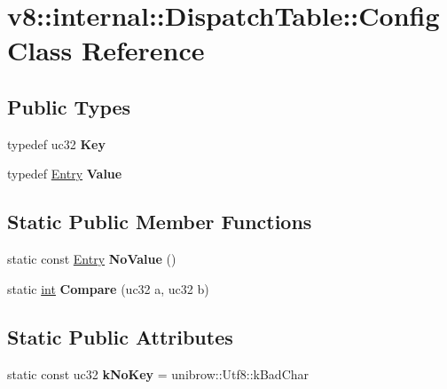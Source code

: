 \hypertarget{classv8_1_1internal_1_1DispatchTable_1_1Config}{}\section{v8\+:\+:internal\+:\+:Dispatch\+Table\+:\+:Config Class Reference}
\label{classv8_1_1internal_1_1DispatchTable_1_1Config}
\subsection*{Public Types}
\begin{DoxyCompactItemize}
\item 
\mbox{\label{classv8_1_1internal_1_1DispatchTable_1_1Config_a3e54d76bbce85cbd2193db08c09689cb}} 
typedef uc32 {\bfseries Key}
\item 
\mbox{\label{classv8_1_1internal_1_1DispatchTable_1_1Config_ac29a7427f5a168fed9eda9780321c7d6}} 
typedef \mbox{\hyperlink{classv8_1_1internal_1_1DispatchTable_1_1Entry}{Entry}} {\bfseries Value}
\end{DoxyCompactItemize}
\subsection*{Static Public Member Functions}
\begin{DoxyCompactItemize}
\item 
\mbox{\label{classv8_1_1internal_1_1DispatchTable_1_1Config_a1ce800a2b555281b74ad8d63416358aa}} 
static const \mbox{\hyperlink{classv8_1_1internal_1_1DispatchTable_1_1Entry}{Entry}} {\bfseries No\+Value} ()
\item 
\mbox{\label{classv8_1_1internal_1_1DispatchTable_1_1Config_a0e59c3e6a8320340e7b631946bb17cc3}} 
static \mbox{\hyperlink{classint}{int}} {\bfseries Compare} (uc32 a, uc32 b)
\end{DoxyCompactItemize}
\subsection*{Static Public Attributes}
\begin{DoxyCompactItemize}
\item 
\mbox{\label{classv8_1_1internal_1_1DispatchTable_1_1Config_a1960ae5bcfe8f4442eb9225e370f3ec1}} 
static const uc32 {\bfseries k\+No\+Key} = unibrow\+::\+Utf8\+::k\+Bad\+Char
\end{DoxyCompactItemize}


